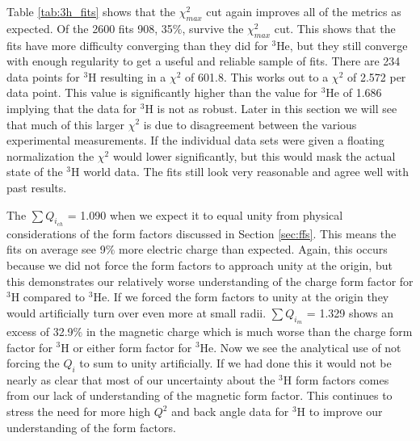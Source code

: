Table \ref{tab:3h_fits} shows that the $\chi^2_{max}$ cut again improves all of the metrics as expected. Of the 2600 fits 908, 35$\%$, survive the $\chi^2_{max}$ cut. This shows that the fits have more difficulty converging than they did for $^3$He, but they still converge with enough regularity to get a useful and reliable sample of fits. There are 234 data points for $^3$H resulting in a $\chi^2$ of 601.8. This works out to a $\chi^2$ of 2.572 per data point. This value is significantly higher than the value for $^3$He of 1.686 implying that the data for $^3$H is not as robust. Later in this section we will see that much of this larger $\chi^2$ is due to disagreement between the various experimental measurements. If the individual data sets were given a floating normalization the $\chi^2$ would lower significantly, but this would mask the actual state of the $^3$H world data. The fits still look very reasonable and agree well with past results.%

The $\sum Q_{i_{ch}}$ = 1.090 when we expect it to equal unity from physical considerations of the form factors discussed in Section \ref{sec:ffs}. This means the fits on average see 9$\%$ more electric charge than expected. Again, this occurs because we did not force the form factors to approach unity at the origin, but this demonstrates our relatively worse understanding of the charge form factor for $^3$H compared to $^3$He. If we forced the form factors to unity at the origin they would artificially turn over even more at small radii. $\sum Q_{i_{m}}$ = 1.329 shows an excess of 32.9$\%$ in the magnetic charge which is much worse than the charge form factor for $^3$H or either form factor for $^3$He. Now we see the analytical use of not forcing the $Q_i$ to sum to unity artificially. If we had done this it would not be nearly as clear that most of our uncertainty about the $^3$H form factors comes from our lack of understanding of the magnetic form factor. This continues to stress the need for more high $Q^2$ and back angle data for $^3$H to improve our understanding of the form factors.%

